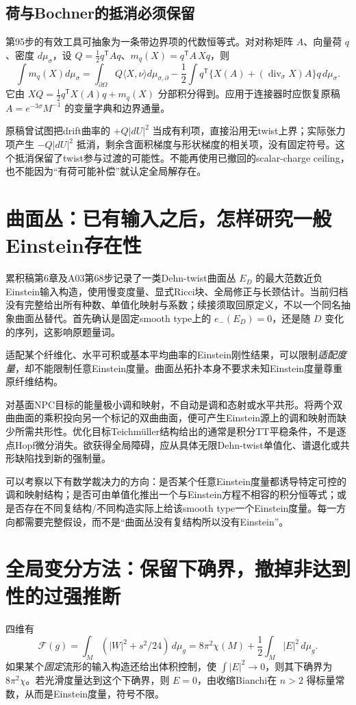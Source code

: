 \documentclass[UTF8,a4paper,11pt,fontset=fandol]{ctexart}
\numberwithin{equation}{section}
\theoremstyle{definition}
\newcommand{\dd}{\,d\mu_g}
\begin{document}
\subsection{荷与Bochner的抵消必须保留}
第95步的有效工具可抽象为一条带边界项的代数恒等式。对对称矩阵 $A$、向量荷 $q$、密度 $d\mu_\sigma$，设 $Q=\frac12q^{\mathsf T}Aq$、$m_q(X)=q^{\mathsf T}A\,Xq$，则
\begin{equation}\label{eq:charge}
\int m_q(X)d\mu_\sigma=
\int_{\partial\Omega}Q\langle X,\nu\rangle d\mu_{\sigma,\partial}
-\frac12\int q^{\mathsf T}\{X(A)+(\operatorname{div}_\sigma X)A\}q\,d\mu_\sigma.
\end{equation}
它由 $XQ=\frac12q^{\mathsf T}X(A)q+m_q(X)$ 分部积分得到。应用于连接器时应恢复原稿 $A=e^{-3\sigma}M^{-1}$ 的变量字典和边界通量。

原稿曾试图把drift曲率的 $+Q|dU|^2$ 当成有利项，直接沿用无twist上界；实际张力项产生 $-Q|dU|^2$ 抵消，剩余含面积梯度与形状梯度的相关项，没有固定符号。这个抵消保留了twist参与过渡的可能性。不能再使用已撤回的scalar-charge ceiling，也不能因为“有荷可能补偿”就认定全局解存在。

\section{曲面丛：已有输入之后，怎样研究一般Einstein存在性}
累积稿第6章及A03第68步记录了一类Dehn-twist曲面丛 $E_D$ 的最大范数近负Einstein输入构造，使用慢变度量、显式Ricci块、全局修正与长颈估计。当前归档没有完整给出所有种数、单值化映射与系数；续接须取回原定义，不以一个同名抽象曲面丛替代。首先确认是固定smooth type上的 $e_-(E_D)=0$，还是随 $D$ 变化的序列，这影响原题量词。

适配某个纤维化、水平可积或基本平均曲率的Einstein刚性结果，可以限制\emph{适配度量}，却不能限制任意Einstein度量。曲面丛拓扑本身不要求未知Einstein度量尊重原纤维结构。

对基面NPC目标的能量极小调和映射，不自动是调和态射或水平共形。将两个双曲曲面的乘积投向另一个标记的双曲曲面，便可产生Einstein源上的调和映射而缺少所需共形性。优化目标Teichm\"uller结构给出的通常是积分TT平稳条件，不是逐点Hopf微分消失。欲获得全局障碍，应从具体无限Dehn-twist单值化、谱退化或共形缺陷找到新的强制量。

可以考察以下有数学裁决力的方向：是否某个任意Einstein度量都诱导特定可控的调和映射结构；是否可由单值化推出一个与Einstein方程不相容的积分恒等式；或是否存在不同复结构/不同构造实际上给该smooth type一个Einstein度量。每一方向都需要完整假设，而不是“曲面丛没有复结构所以没有Einstein”。

\section{全局变分方法：保留下确界，撤掉非达到性的过强推断}
四维有
\begin{equation}\label{eq:F}
\mathcal F(g)=\int_M(|W|^2+s^2/24)\dd
=8\pi^2\chi(M)+\frac12\int_M|E|^2\dd.
\end{equation}
如果某个\emph{固定}流形的输入构造还给出体积控制，使 $\int|E|^2\to0$，则其下确界为 $8\pi^2\chi$。若光滑度量达到这个下确界，则 $E=0$，由收缩Bianchi在 $n>2$ 得标量常数，从而是Einstein度量，符号不限。
\end{document}
